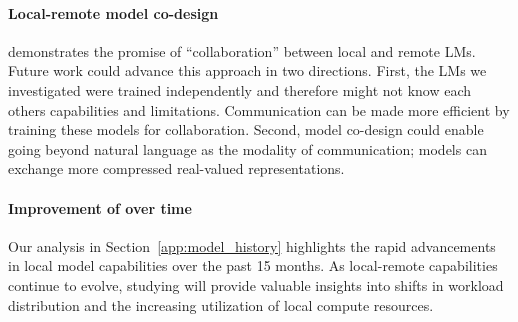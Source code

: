 \vspace{-0.5em}\paragraph{Local-remote model co-design} \system demonstrates the promise of ``collaboration'' between local and remote LMs. Future work could advance this approach in two directions. First, the LMs we investigated were trained independently and therefore might not know each others capabilities and limitations. Communication can be made more efficient by training these models for collaboration. Second, model co-design could enable going beyond natural language as the modality of communication; models can exchange more compressed real-valued representations.



\vspace{-0.5em}\paragraph{Improvement of \system over time} Our analysis in Section~\ref{app:model_history} highlights the rapid advancements in local model capabilities over the past 15 months. As local-remote capabilities continue to evolve, studying \system will provide valuable insights into shifts in workload distribution and the increasing utilization of local compute resources.
